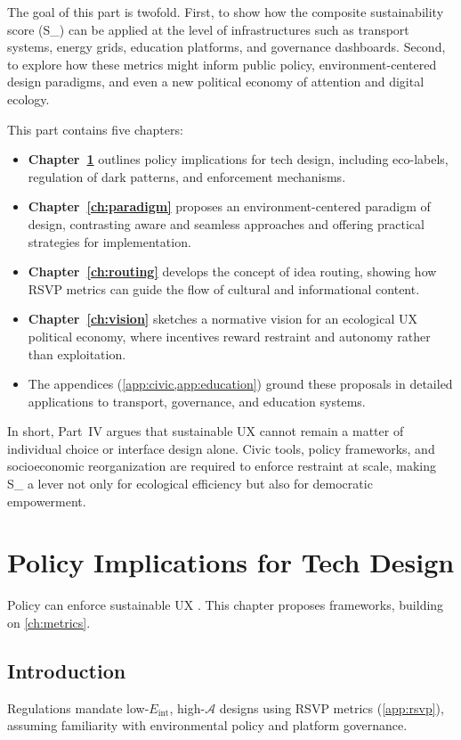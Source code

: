 \documentclass[openany]{book}
\newcommand{\Eint}{E_{\mathrm{int}}} %
\newcommand{\Auton}{\mathcal{A}} %
\newcommand{\SUX}{S_{\mathrm{UX}}} %
\begin{document}
The goal of this part is twofold. First, to show how the composite
sustainability score (\SUX) can be applied at the level of infrastructures
such as transport systems, energy grids, education platforms, and governance
dashboards. Second, to explore how these metrics might inform public policy,
environment-centered design paradigms, and even a new political economy of
attention and digital ecology.

This part contains five chapters:

\begin{itemize}
  \item \textbf{Chapter~\ref{ch:policy}} outlines policy implications for
  tech design, including eco-labels, regulation of dark patterns, and
  enforcement mechanisms.
  \item \textbf{Chapter~\ref{ch:paradigm}} proposes an environment-centered
  paradigm of design, contrasting aware and seamless approaches and offering
  practical strategies for implementation.
  \item \textbf{Chapter~\ref{ch:routing}} develops the concept of idea
  routing, showing how RSVP metrics can guide the flow of cultural and
  informational content.
  \item \textbf{Chapter~\ref{ch:vision}} sketches a normative vision for an
  ecological UX political economy, where incentives reward restraint and
  autonomy rather than exploitation.
  \item The appendices (\cref{app:civic,app:education}) ground these proposals
  in detailed applications to transport, governance, and education systems.
\end{itemize}

In short, Part~IV argues that sustainable UX cannot remain a matter of
individual choice or interface design alone. Civic tools, policy frameworks,
and socioeconomic reorganization are required to enforce restraint at scale,
making \SUX{} a lever not only for ecological efficiency but also for
democratic empowerment.

\chapter{Policy Implications for Tech Design}
\label{ch:policy}

Policy can enforce sustainable UX \citep{adobe2021,doctorow2022}. This chapter proposes frameworks, building on \cref{ch:metrics}.

\section{Introduction}
\label{sec:policy-intro}
Regulations mandate low-\(\Eint\), high-\(\Auton\) designs using RSVP metrics (\cref{app:rsvp}), assuming familiarity with environmental policy and platform governance.
\end{document}
